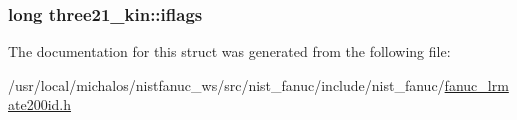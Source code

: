 \hypertarget{structthree21__kin_a0635045024d80c336c4082c0a1dac24a}{
\subsubsection[{iflags}]{\setlength{\rightskip}{0pt plus 5cm}long three21\-\_\-kin\-::iflags}}\label{structthree21__kin_a0635045024d80c336c4082c0a1dac24a}


The documentation for this struct was generated from the following file\-:\begin{DoxyCompactItemize}
\item 
/usr/local/michalos/nistfanuc\-\_\-ws/src/nist\-\_\-fanuc/include/nist\-\_\-fanuc/\hyperlink{fanuc__lrmate200id_8h}{fanuc\-\_\-lrmate200id.\-h}\end{DoxyCompactItemize}
